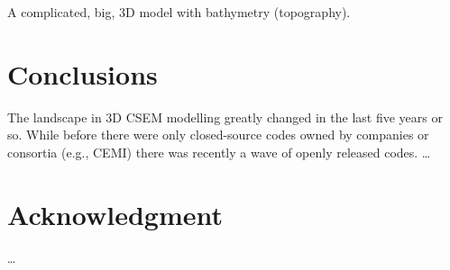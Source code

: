 \documentclass[paper,twocolumn,twoside]{geophysics}
\begin{document}
A complicated, big, 3D model with bathymetry (topography).

\section{Conclusions}

The landscape in 3D CSEM modelling greatly changed in the last five years or
so. While before there were only closed-source codes owned by companies or
consortia (e.g., CEMI) there was recently a wave of openly released codes.
\dots

\section{Acknowledgment}
\dots





\end{document}
